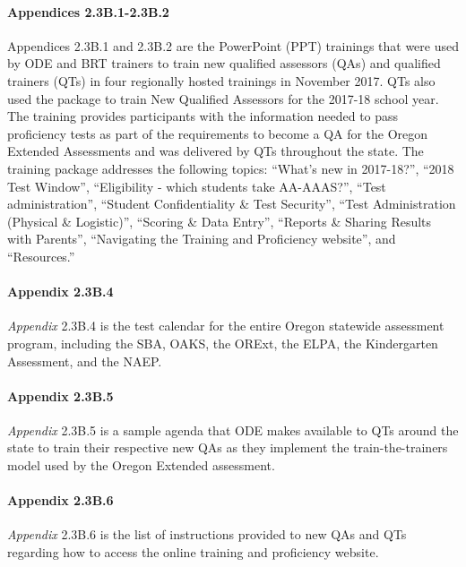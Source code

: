 \documentclass[]{article}
\let\oldparagraph\paragraph
\renewcommand{\paragraph}[1]{\oldparagraph{#1}\mbox{}}
\begin{document}
\paragraph{Appendices 2.3B.1-2.3B.2}\label{appendices-2.3b.1-2.3b.2}

Appendices 2.3B.1 and 2.3B.2 are the PowerPoint (PPT) trainings that
were used by ODE and BRT trainers to train new qualified assessors (QAs)
and qualified trainers (QTs) in four regionally hosted trainings in
November 2017. QTs also used the package to train New Qualified
Assessors for the 2017-18 school year. The training provides
participants with the information needed to pass proficiency tests as
part of the requirements to become a QA for the Oregon Extended
Assessments and was delivered by QTs throughout the state. The training
package addresses the following topics: ``What's new in 2017-18?'',
``2018 Test Window'', ``Eligibility - which students take AA-AAAS?'',
``Test administration'', ``Student Confidentiality \& Test Security'',
``Test Administration (Physical \& Logistic)'', ``Scoring \& Data
Entry'', ``Reports \& Sharing Results with Parents'', ``Navigating the
Training and Proficiency website'', and ``Resources.''

\paragraph{Appendix 2.3B.4}\label{appendix-2.3b.4}

\emph{Appendix} 2.3B.4 is the test calendar for the entire Oregon
statewide assessment program, including the SBA, OAKS, the ORExt, the
ELPA, the Kindergarten Assessment, and the NAEP.

\paragraph{Appendix 2.3B.5}\label{appendix-2.3b.5}

\emph{Appendix} 2.3B.5 is a sample agenda that ODE makes available to
QTs around the state to train their respective new QAs as they implement
the train-the-trainers model used by the Oregon Extended assessment.

\paragraph{Appendix 2.3B.6}\label{appendix-2.3b.6}

\emph{Appendix} 2.3B.6 is the list of instructions provided to new QAs
and QTs regarding how to access the online training and proficiency
website.
\end{document}
